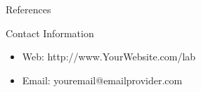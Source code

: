 \documentclass[final]{beamer}
\newlength{\onecolwid}
\begin{document}
\begin{frame}[t]
\begin{columns}[t]
\begin{column}{\onecolwid}
\begin{block}{References}
\end{block}








\begin{alertblock}{Contact Information}

\begin{itemize}
\item Web: http://www.YourWebsite.com/lab
\item Email: youremail@emailprovider.com
\end{itemize}

\end{alertblock}


\end{column} %

\end{columns} %

\end{frame} %
\end{document}
